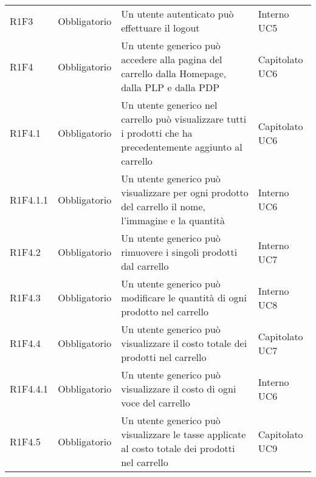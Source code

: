 {\begin{longtable}{C{2.5cm} C{2.8cm} C{6.7cm} C{2.5cm}}

R1F3 & Obbligatorio & Un utente autenticato può effettuare il logout & Interno \newline UC5 \\


R1F4 & Obbligatorio & Un utente generico può accedere alla pagina del carrello dalla Homepage, dalla PLP e dalla PDP & Capitolato \newline UC6 \\
R1F4.1 & Obbligatorio & Un utente generico nel carrello può visualizzare tutti i prodotti che ha precedentemente aggiunto al carrello & Capitolato \newline UC6 \\
R1F4.1.1 & Obbligatorio & Un utente generico può visualizzare per ogni prodotto del carrello il nome, l'immagine e la quantità & Interno \newline UC6 \\
R1F4.2 & Obbligatorio & Un utente generico può rimuovere i singoli prodotti dal carrello & Interno \newline UC7 \\
R1F4.3 & Obbligatorio & Un utente generico può modificare le quantità di ogni prodotto nel carrello & Interno \newline UC8\\
R1F4.4 & Obbligatorio & Un utente generico può visualizzare il costo totale dei prodotti nel carrello & Capitolato \newline UC7\\
R1F4.4.1 & Obbligatorio & Un utente generico può visualizzare il costo di ogni voce del carrello & Interno \newline UC6\\
R1F4.5 & Obbligatorio & Un utente generico può visualizzare le tasse applicate al costo totale dei prodotti nel carrello & Capitolato \newline UC9\\



\end{longtable}}
